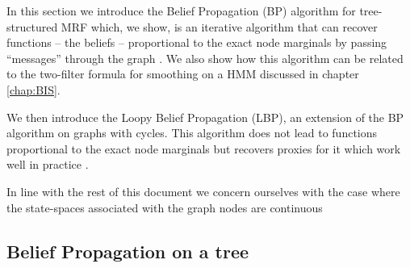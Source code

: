 
In this section we introduce the Belief Propagation (BP) algorithm for tree-structured MRF which, we show, is an iterative algorithm that can recover functions -- the beliefs -- proportional to the exact node marginals by passing ``messages'' through the graph \citep{pearl88,wainwright08}. We also show how this algorithm can be related to the two-filter formula for smoothing on a HMM discussed in chapter \ref{chap:BIS}.

We then introduce the Loopy Belief Propagation (LBP), an extension of the BP algorithm on graphs with cycles. This algorithm does not lead to functions proportional to the exact node marginals but recovers proxies for it which work well in practice \citep{yedidia02,sudderth03}.

In line with the rest of this document we concern ourselves with the case where the state-spaces associated with the graph nodes are continuous

\subsection{Belief Propagation on a tree}



